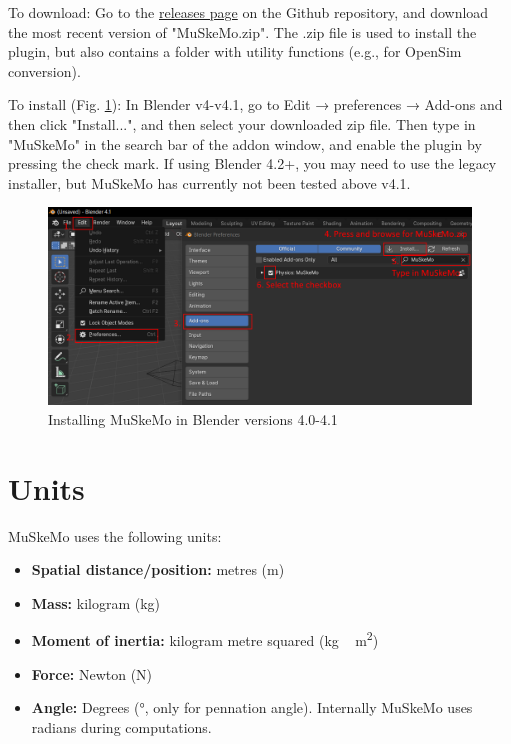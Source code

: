 \documentclass{article}
\begin{document}
To download: Go to the \href{https://github.com/PashavanBijlert/MuSkeMo/releases}{releases page} on the Github repository, and download the most recent version of "MuSkeMo.zip". The .zip file is used to install the plugin, but also contains a folder with utility functions (e.g., for OpenSim conversion).

To install (Fig. \ref{fig:installation}): In Blender v4-v4.1, go to Edit → preferences → Add-ons and then click "Install...", and then select your downloaded zip file. Then type in "MuSkeMo" in the search bar of the addon window, and enable the plugin by pressing the check mark. If using Blender 4.2+, you may need to use the legacy installer, but MuSkeMo has currently not been tested above v4.1.

\begin{figure}[h]
    \centering
    \includegraphics[width=\textwidth]{figures/install_instructions.png} %
    \caption{Installing MuSkeMo in Blender versions 4.0-4.1}
    \label{fig:installation}
\end{figure}

\section{Units}

MuSkeMo uses the following units:

\begin{itemize}
    \item \textbf{Spatial distance/position:} metres (\si{\metre})
    \item \textbf{Mass:} kilogram (\si{\kilogram})
    \item \textbf{Moment of inertia:} kilogram metre squared (\si{kg\,m^2})
    \item \textbf{Force:} Newton (\si{N})
    \item \textbf{Angle:} Degrees (\si{\degree}, only for pennation angle). Internally MuSkeMo uses radians during computations.
\end{itemize}
\end{document}
